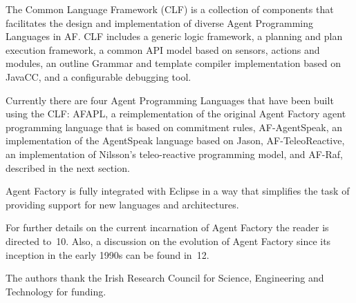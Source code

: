 \documentclass[preprint]{sigplanconf} %
\begin{document}
The Common Language Framework (CLF) is a collection of components that
facilitates the design and implementation of diverse Agent Programming
Languages in AF. CLF includes a generic logic framework, a planning and
plan execution framework, a common API model based on sensors, actions and
modules, an outline Grammar and template compiler implementation based on
JavaCC, and a configurable debugging tool.

Currently there are four Agent Programming Languages that have been built
using the CLF: AFAPL, a reimplementation of the original Agent Factory
agent programming language that is based on commitment rules,
AF-AgentSpeak, an implementation of the AgentSpeak language based on
Jason, AF-TeleoReactive, an implementation of Nilsson's teleo-reactive
programming model, and AF-Raf, described in the next section.

Agent Factory is fully integrated with Eclipse in a way that simplifies
the task of providing support for new languages and architectures.

For further details on the current incarnation of Agent Factory the reader
is directed to~\cite{}10. Also, a discussion on the evolution of Agent
Factory since its inception in the early 1990s can be found in~\cite{}12.

\acks

The authors thank the Irish Research Council for Science, Engineering and
Technology for funding.




\end{document}
